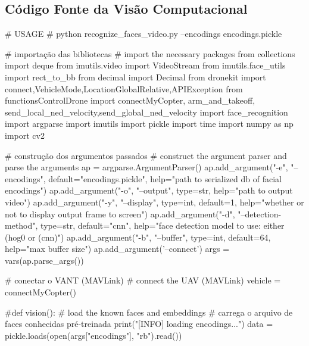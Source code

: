 
\begin{apendicesenv}

\partapendices

\chapter{Código Fonte da Visão Computacional}

\begin{python_}
# USAGE
# python recognize_faces_video.py --encodings encodings.pickle

# importação das bibliotecas
# import the necessary packages
from collections import deque
from imutils.video import VideoStream
from imutils.face_utils import rect_to_bb
from decimal import Decimal
from dronekit import connect,VehicleMode,LocationGlobalRelative,APIException
from functionsControlDrone import connectMyCopter, 
arm_and_takeoff, send_local_ned_velocity,send_global_ned_velocity
import face_recognition
import argparse
import imutils
import pickle
import time
import numpy as np
import cv2


# construção dos argumentos passados
# construct the argument parser and parse the arguments
ap = argparse.ArgumentParser()
ap.add_argument("-e", "--encodings", default="encodings.pickle",
help="path to serialized db of facial encodings")
ap.add_argument("-o", "--output", type=str,	
help="path to output video")
ap.add_argument("-y", "--display", type=int, default=1,	
help="whether or not to display output frame to screen")
ap.add_argument("-d", "--detection-method", type=str, default="cnn", 
help="face detection model to use: either (hog0 or (cnn)")
ap.add_argument("-b", "--buffer", type=int, default=64,	
help="max buffer size")
ap.add_argument('--connect')	
args = vars(ap.parse_args())

# conectar o VANT (MAVLink)
# connect the UAV (MAVLink)
vehicle = connectMyCopter()

#def vision():
# load the known faces and embeddings
# carrega o arquivo de faces conhecidas pré-treinada
print("[INFO] loading encodings...")
data = pickle.loads(open(args["encodings"], "rb").read())


\end{python_}
\end{apendicesenv}
